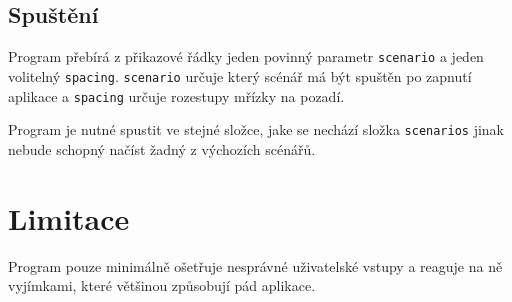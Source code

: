 \documentclass[12pt]{article}
\newcommand{\code}[1]{\mbox{\texttt{#1}}}
\begin{document}
\subsection{Spuštění}

Program přebírá z přikazové řádky jeden povinný parametr \code{scenario} a jeden
volitelný \code{spacing}. \code{scenario} určuje který scénář má být spuštěn po
zapnutí aplikace a \code{spacing} určuje rozestupy mřízky na pozadí.

Program je nutné spustit ve stejné složce, jake se nechází složka
\code{scenarios} jinak nebude schopný načíst žadný z výchozích scénářů.

\section{Limitace}

Program pouze minimálně ošetřuje nesprávné uživatelské vstupy a reaguje na ně
vyjímkami, které většinou způsobují pád aplikace. 
\end{document}
